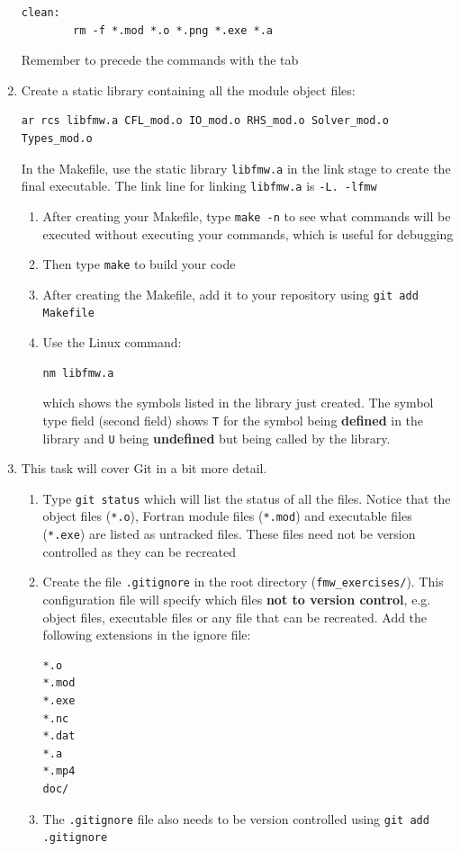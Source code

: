 \documentclass[12pt]{article}
\begin{document}
\begin{enumerate}
\begin{verbatim}
clean:
        rm -f *.mod *.o *.png *.exe *.a
\end{verbatim}
Remember to precede the commands with the tab
\item Create a static library containing all the module object files:
\begin{verbatim}
ar rcs libfmw.a CFL_mod.o IO_mod.o RHS_mod.o Solver_mod.o Types_mod.o
\end{verbatim}
In the Makefile, use the static library \texttt{libfmw.a} in the link stage to create the final executable. The link line for
linking \texttt{libfmw.a} is \texttt{-L. -lfmw}
\begin{enumerate}
\item After creating your Makefile, type \texttt{make -n} to see what commands will be executed without executing
your commands, which is useful for debugging
\item Then type \texttt{make} to build your code 
\item After creating the Makefile, add it to your repository using \texttt{git add Makefile}
\item Use the Linux command: 
\begin{verbatim}
nm libfmw.a
\end{verbatim}
which shows the symbols listed in the library just created. The symbol type field (second field) shows
\texttt{T} for the symbol being {\bf defined} in the library and \texttt{U} being {\bf undefined} but being called by the library. 
\end{enumerate}
\item This task will cover Git in a bit more detail.
\begin{enumerate}
\item Type \texttt{git status} which will list the status of all the files. Notice that the object 
files (\texttt{*.o}), Fortran module files (\texttt{*.mod}) and executable files (\texttt{*.exe}) are listed as 
untracked files. These files need not be version controlled as they can be recreated
\item Create the file \texttt{.gitignore} in the root directory (\texttt{fmw\_exercises/}). This configuration file will 
specify which files {\bf not to version control}, e.g. object files, executable files or any file that can
be recreated. Add the following extensions in the ignore file:
\begin{verbatim}
*.o
*.mod
*.exe
*.nc
*.dat
*.a
*.mp4
doc/
\end{verbatim}
\item The \texttt{.gitignore} file also needs to be version controlled using \texttt{git add .gitignore}

\end{enumerate}
\end{enumerate}
\end{document}
